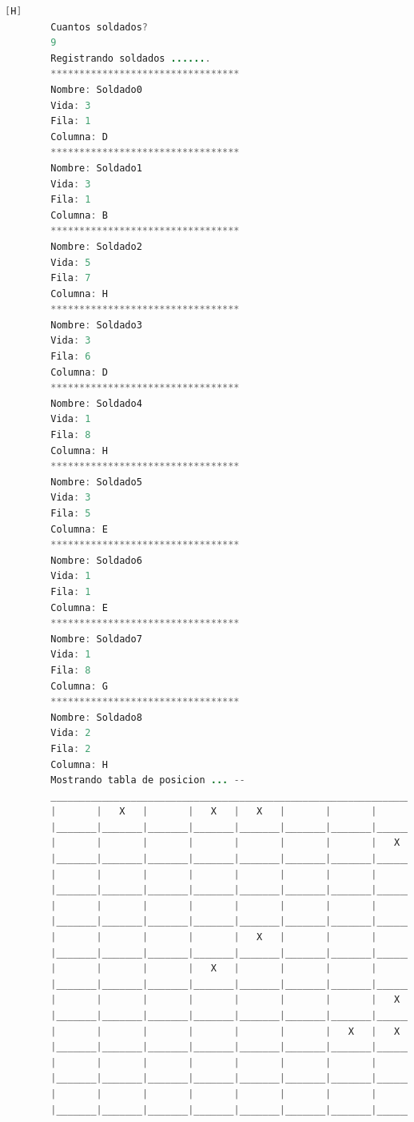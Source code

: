 \documentclass{article}
\begin{document}
	\begin{lstlisting}[language=java,caption={Las lineas de codigos del metodo creado: \textcolor{red}{VER EL TEXTO EN LATEX EN LA IMAGEN SE DEFORMA O EJECUTARLO}}][H]
		Cuantos soldados? 
		9
		Registrando soldados .......
		*********************************
		Nombre: Soldado0
		Vida: 3
		Fila: 1
		Columna: D
		*********************************
		Nombre: Soldado1
		Vida: 3
		Fila: 1
		Columna: B
		*********************************
		Nombre: Soldado2
		Vida: 5
		Fila: 7
		Columna: H
		*********************************
		Nombre: Soldado3
		Vida: 3
		Fila: 6
		Columna: D
		*********************************
		Nombre: Soldado4
		Vida: 1
		Fila: 8
		Columna: H
		*********************************
		Nombre: Soldado5
		Vida: 3
		Fila: 5
		Columna: E
		*********************************
		Nombre: Soldado6
		Vida: 1
		Fila: 1
		Columna: E
		*********************************
		Nombre: Soldado7
		Vida: 1
		Fila: 8
		Columna: G
		*********************************
		Nombre: Soldado8
		Vida: 2
		Fila: 2
		Columna: H
		Mostrando tabla de posicion ... --
		_________________________________________________________________________________
		|       |   X   |       |   X   |   X   |       |       |       |       |       |
		|_______|_______|_______|_______|_______|_______|_______|_______|_______|_______|
		|       |       |       |       |       |       |       |   X   |       |       |
		|_______|_______|_______|_______|_______|_______|_______|_______|_______|_______|
		|       |       |       |       |       |       |       |       |       |       |
		|_______|_______|_______|_______|_______|_______|_______|_______|_______|_______|
		|       |       |       |       |       |       |       |       |       |       |
		|_______|_______|_______|_______|_______|_______|_______|_______|_______|_______|
		|       |       |       |       |   X   |       |       |       |       |       |
		|_______|_______|_______|_______|_______|_______|_______|_______|_______|_______|
		|       |       |       |   X   |       |       |       |       |       |       |
		|_______|_______|_______|_______|_______|_______|_______|_______|_______|_______|
		|       |       |       |       |       |       |       |   X   |       |       |
		|_______|_______|_______|_______|_______|_______|_______|_______|_______|_______|
		|       |       |       |       |       |       |   X   |   X   |       |       |
		|_______|_______|_______|_______|_______|_______|_______|_______|_______|_______|
		|       |       |       |       |       |       |       |       |       |       |
		|_______|_______|_______|_______|_______|_______|_______|_______|_______|_______|
		|       |       |       |       |       |       |       |       |       |       |
		|_______|_______|_______|_______|_______|_______|_______|_______|_______|_______|


\end{lstlisting}
\end{document}

